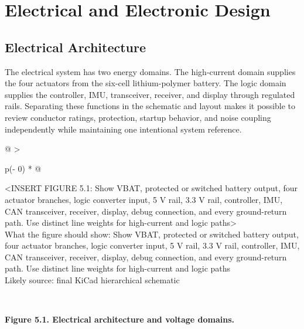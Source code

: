 \chapter{Electrical and Electronic Design}\label{ch:electrical-and-electronic-design}

\section{Electrical Architecture}\label{electrical-architecture}

The electrical system has two energy domains. The high-current domain
supplies the four actuators from the six-cell lithium-polymer battery.
The logic domain supplies the controller, IMU, transceiver, receiver,
and display through regulated rails. Separating these functions in the
schematic and layout makes it possible to review conductor ratings,
protection, startup behavior, and noise coupling independently while
maintaining one intentional system reference.

\begin{longtable}[]{@{}
  >{\raggedright\arraybackslash}p{(\columnwidth - 0\tabcolsep) * }@{}}
\toprule\noalign{}
\begin{minipage}[b]{\linewidth}\raggedright
\textless INSERT FIGURE 5.1: Show VBAT, protected or switched battery
output, four actuator branches, logic converter input, 5 V rail, 3.3 V
rail, controller, IMU, CAN transceiver, receiver, display, debug
connection, and every ground-return path. Use distinct line weights for
high-current and logic paths\textgreater{}\\
What the figure should show: Show VBAT, protected or switched battery
output, four actuator branches, logic converter input, 5 V rail, 3.3 V
rail, controller, IMU, CAN transceiver, receiver, display, debug
connection, and every ground-return path. Use distinct line weights for
high-current and logic paths\\
Likely source: final KiCad hierarchical schematic\strut
\end{minipage} \\
\midrule\noalign{}
\endhead
\bottomrule\noalign{}
\endlastfoot
\end{longtable}

\begin{center}\singlespacing
{}
\textbf{Figure 5.1. Electrical architecture and voltage domains.}
\end{center}

